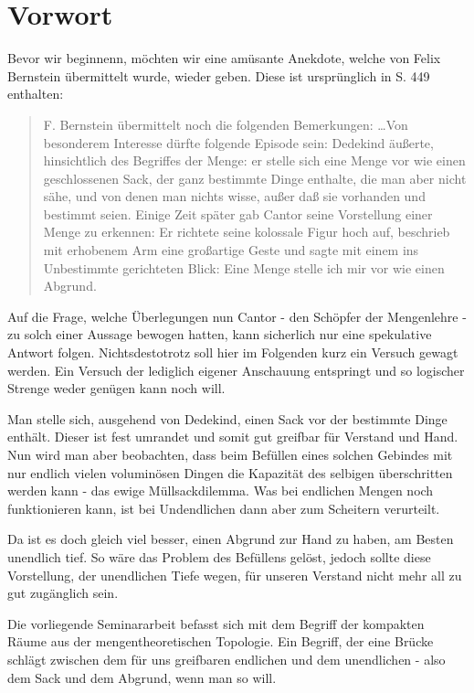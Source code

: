 \chapter{Vorwort}
Bevor wir beginnenn, möchten wir eine amüsante Anekdote, welche von Felix Bernstein übermittelt 
wurde, wieder geben. Diese ist ursprünglich in \cite{book:dedekind} S. 449 enthalten:

\begin{quote}
\glqq F. Bernstein übermittelt noch die folgenden Bemerkungen:
\glq \dots Von besonderem Interesse dürfte folgende Episode sein: Dedekind äußerte, hinsichtlich 
des Begriffes der Menge: er stelle sich eine Menge vor wie einen geschlossenen
Sack, der ganz bestimmte Dinge enthalte, die man aber nicht sähe, und von denen man
nichts wisse, außer daß sie vorhanden und bestimmt seien. Einige Zeit später gab Cantor
seine Vorstellung einer Menge zu erkennen: Er richtete seine kolossale Figur hoch auf,
beschrieb mit erhobenem Arm eine großartige Geste und sagte mit einem ins Unbestimmte 
gerichteten Blick: \glq Eine Menge stelle ich mir vor wie einen Abgrund.\grq \grq \grqq
\end{quote}

Auf die Frage, welche Überlegungen nun Cantor - den Schöpfer der Mengenlehre - 
zu solch einer Aussage bewogen hatten, kann sicherlich nur eine spekulative Antwort folgen.
Nichtsdestotrotz soll hier im Folgenden kurz ein Versuch gewagt werden. Ein Versuch der lediglich
eigener Anschauung entspringt und so logischer Strenge weder genügen kann noch will.

Man stelle sich, ausgehend von Dedekind, einen Sack vor der bestimmte Dinge enthält.
Dieser ist fest umrandet und somit gut greifbar für Verstand und Hand. Nun wird man
aber beobachten, dass beim Befüllen eines solchen Gebindes mit nur endlich vielen voluminösen Dingen 
die Kapazität des selbigen überschritten werden kann - das ewige \glqq Müllsackdilemma\grqq .
Was bei endlichen Mengen noch funktionieren kann, ist bei Undendlichen dann aber zum Scheitern verurteilt.

Da ist es doch gleich viel besser, einen Abgrund zur Hand zu haben, am Besten unendlich tief. So wäre
das Problem des Befüllens gelöst, jedoch sollte diese Vorstellung, der unendlichen Tiefe wegen, für unseren
Verstand nicht mehr all zu gut zugänglich sein.

Die vorliegende Seminararbeit befasst sich mit dem Begriff der kompakten Räume aus der mengentheoretischen
Topologie. Ein Begriff, der eine Brücke schlägt zwischen dem für uns greifbaren endlichen und dem
unendlichen - also dem Sack und dem Abgrund, wenn man so will.

